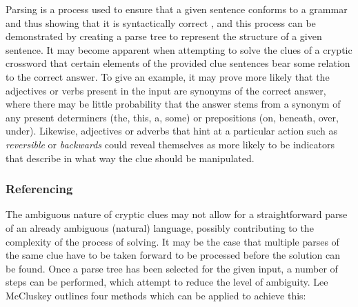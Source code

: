 Parsing is a process used to ensure that a given sentence conforms to a grammar
and thus showing that it is syntactically correct \citep{mccluskey99}, and this
process can be demonstrated by creating a parse tree to represent the structure
of a given sentence. It may become apparent when attempting to solve the clues
of a cryptic crossword that certain elements of the provided clue sentences bear
some relation to the correct answer. To give an example, it may prove more
likely that the adjectives or verbs present in the input are synonyms of the
correct answer, where there may be little probability that the answer stems from
a synonym of any present determiners (the, this, a, some) or prepositions (on,
beneath, over, under). Likewise, adjectives or adverbs that hint at a particular
action such as \emph{reversible} or \emph{backwards} could reveal themselves as
more likely to be indicators that describe in what way the clue should be
manipulated.

\subsubsection{Referencing}

The ambiguous nature of cryptic clues may not allow for a straightforward parse
of an already ambiguous (natural) language, possibly contributing to the
complexity of the process of solving. It may be the case that multiple parses of
the same clue have to be taken forward to be processed before the solution can
be found. Once a parse tree has been selected for the given input, a number of
steps can be performed, which attempt to reduce the level of ambiguity. Lee
McCluskey outlines four methods which can be applied to achieve this:

